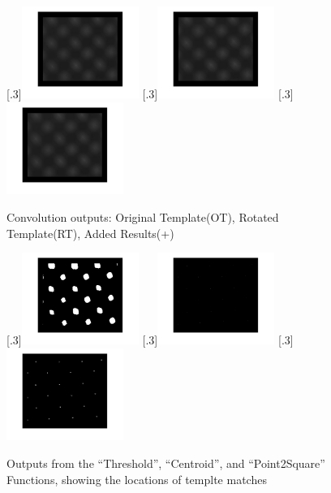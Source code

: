 \documentclass[a4paper]{article}
\begin{document}
	\begin{figure}[H]
		\centering
		[.3\linewidth]{\includegraphics[height=3cm]{Results/Q3/a/qaConv.jpg}}%
		[.3\linewidth]{\includegraphics[height=3cm]{Results/Q3/a/qaConv2.jpg}}%
		[.3\linewidth]{\includegraphics[height=3cm]{Results/Q3/a/qaAddedConv.jpg}}%
		\caption{Convolution outputs: Original Template(OT), Rotated
		Template(RT), Added Results(+)}
		\label{fig:}
	\end{figure}
	\begin{figure}[H]
		\centering
		[.3\linewidth]{\includegraphics[height=3cm]{Results/Q3/a/qaThresh.jpg}}%
		[.3\linewidth]{\includegraphics[height=3cm]{Results/Q3/a/qaCentroid.jpg}}%
		[.3\linewidth]{\includegraphics[height=3cm]{Results/Q3/a/qaP2S.jpg}}%
		\caption{Outputs from the ``Threshold'', ``Centroid'', and
		``Point2Square'' Functions, showing the locations of templte
	matches}
		\label{fig:}
	\end{figure}
\end{document}

